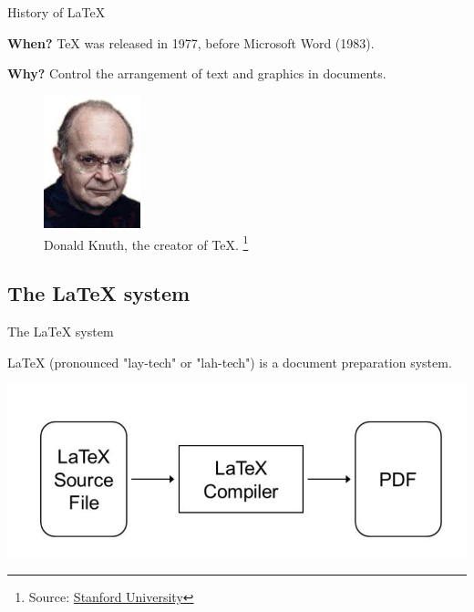 \documentclass[inputenc]{beamer}
\begin{document}
\begin{frame}{History of \LaTeX{}}
    
    \textbf{When?} \TeX{} was released in 1977, before Microsoft Word (1983).
    
    \vspace{0.5cm}
    \textbf{Why?} Control the arrangement of text and graphics in documents. 
    
    \begin{figure}
        \centering
        \includegraphics[width=0.25\textwidth]{knuth}
        \caption{Donald Knuth, the creator of \TeX{}. \footnote{Source: \href{https://www-cs-faculty.stanford.edu/~knuth}{Stanford University}}}
    \end{figure}
    
\end{frame}

\subsection{The \LaTeX{} system}

\begin{frame}{The \LaTeX{} system}

\LaTeX{} (pronounced "lay-tech" or "lah-tech") is a document preparation system. 

\includegraphics[width=\textwidth]{latex_system.png}


\end{frame}
\end{document}
